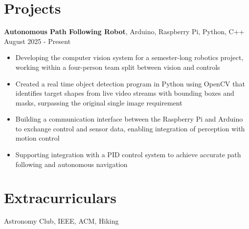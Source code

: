 \documentclass[11pt]{article}
\begin{document}
\section*{Projects}
\vspace{5pt}
\textbf{Autonomous Path Following Robot}, Arduino, Raspberry Pi, Python, C++  \hfill August 2025 - Present
\vspace{-5pt}
\begin{itemize}
  \item Developing the computer vision system for a semester-long robotics project, working within a four-person team split between vision and controls
  \item Created a real time object detection program in Python using OpenCV that identifies target shapes from live video streams with bounding boxes and masks, surpassing the original single image requirement
  \item Building a communication interface between the Raspberry Pi and Arduino to exchange control and sensor data, enabling integration of perception with motion control
  \item Supporting integration with a PID control system to achieve accurate path following and autonomous navigation
\end{itemize}

\vspace{-14pt}

\section*{Extracurriculars}
\vspace{1pt}
\small Astronomy Club, IEEE, ACM, Hiking
\end{document}

